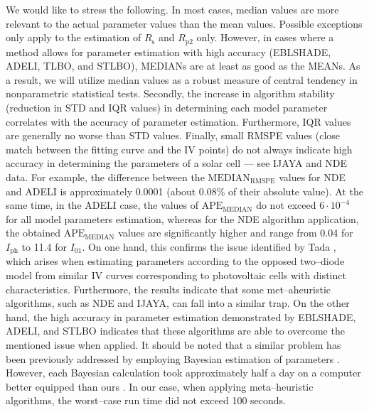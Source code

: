 \documentclass[a4paper,fleqn]{cas-sc}
\begin{document}
We would like to stress the following.
In most cases, median values are more relevant to the actual parameter values than the mean values.
Possible exceptions only apply to the estimation of $R_\mathrm{s}$ and $R_\mathrm{p2}$ only.
However, in cases where a method allows for parameter estimation with high accuracy (EBLSHADE, ADELI, TLBO, and STLBO),
MEDIANs are at least as good as the MEANs.
As a result, we will utilize median values as a robust measure of central tendency in nonparametric statistical tests.
Secondly, the increase in algorithm stability (reduction in STD and IQR values) in determining each model parameter correlates with the accuracy of parameter estimation.
Furthermore, IQR values are generally no worse than STD values.
Finally, small RMSPE values (close match between the fitting curve and the IV points)
do not always indicate high accuracy in determining the parameters of a solar cell --- see IJAYA and NDE data.
For example, the difference between the $\mathrm{MEDIAN}_\mathrm{RMSPE}$ values for NDE and ADELI is approximately 0.0001
(about 0.08\% of their absolute value).
At the same time, in the ADELI case, the values of $\mathrm{APE}_\mathrm{MEDIAN}$ do not exceed $6\cdot 10^{-4}$
for all model parameters estimation,
whereas for the NDE algorithm application, the obtained $\mathrm{APE}_\mathrm{MEDIAN}$ values are significantly higher
and range from 0.04 for $I_\mathrm{ph}$ to 11.4 for $I_{01}$.
On one hand, this confirms the issue identified by Tada \cite{Tada2015Organic,Tada2021}, which arises when estimating
parameters according to the opposed two--diode model from similar IV curves corresponding to photovoltaic cells with distinct characteristics.
Furthermore, the results indicate that some met--aheuristic algorithms, such as NDE and IJAYA, can fall into a similar trap.
On the other hand, the high accuracy in parameter estimation demonstrated by EBLSHADE, ADELI, and STLBO indicates
that these algorithms are able to overcome the mentioned issue when applied.
It should be noted that a similar problem has been previously addressed by employing Bayesian estimation of parameters \cite{Tada2021}.
However, each Bayesian calculation took approximately half a day on a computer better equipped than ours \cite{Tada2021}.
In our case, when applying meta--heuristic algorithms, the worst--case run time did not exceed 100 seconds.
\end{document}
